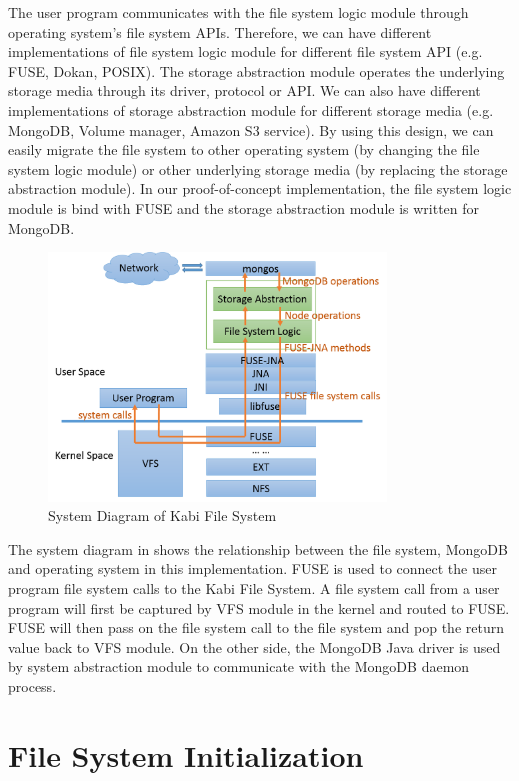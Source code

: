     The user program communicates with the file system logic module through operating system's file system APIs. Therefore, we can have different implementations of file system logic module for different file system API (e.g. FUSE, Dokan, POSIX). The storage abstraction module operates the underlying storage media through its driver, protocol or API. We can also have different implementations of storage abstraction module for different storage media (e.g. MongoDB, Volume manager, Amazon S3 service). By using this design, we can easily migrate the file system to other operating system (by changing the file system logic module) or other underlying storage media (by replacing the storage abstraction module). In our proof-of-concept implementation, the file system logic module is bind with FUSE and the storage abstraction module is written for MongoDB. 

\begin{figure}[hbtp]
\centering
\includegraphics[width=0.8\textwidth]{Chapter-3/figs/fig1.png}
\caption{System Diagram of Kabi File System}
\label{fig:diagram}
\end{figure}

    The system diagram in  shows the relationship between the file system, MongoDB and operating system in this implementation. FUSE is used to connect the user program file system calls to the Kabi File System. A file system call from a user program will first be captured by VFS module in the kernel and routed to FUSE. FUSE will then pass on the file system call to the file system and pop the return value back to VFS module. On the other side, the MongoDB Java driver is used by system abstraction module to communicate with the MongoDB daemon process.

\section{File System Initialization}

